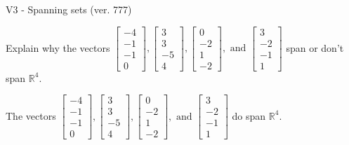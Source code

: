 \begin{exercise}
  \begin{exerciseTitle}V3 - Spanning sets (ver. 777)\end{exerciseTitle}
  \begin{exerciseStatement}
    Explain why the vectors \(\left[\begin{array}{r}
-4 \\
-1 \\
-1 \\
0
\end{array}\right] , \left[\begin{array}{r}
3 \\
3 \\
-5 \\
4
\end{array}\right] , \left[\begin{array}{r}
0 \\
-2 \\
1 \\
-2
\end{array}\right] , \text{ and } \left[\begin{array}{r}
3 \\
-2 \\
-1 \\
1
\end{array}\right]\) span or don't span \(\mathbb{R}^4\). 
	


  \end{exerciseStatement}
  \begin{exerciseAnswer}
   The vectors \(\left[\begin{array}{r}
-4 \\
-1 \\
-1 \\
0
\end{array}\right] , \left[\begin{array}{r}
3 \\
3 \\
-5 \\
4
\end{array}\right] , \left[\begin{array}{r}
0 \\
-2 \\
1 \\
-2
\end{array}\right] , \text{ and } \left[\begin{array}{r}
3 \\
-2 \\
-1 \\
1
\end{array}\right]\) 
  	 do  
	span \(\mathbb{R}^4\).
  


  \end{exerciseAnswer}
\end{exercise}